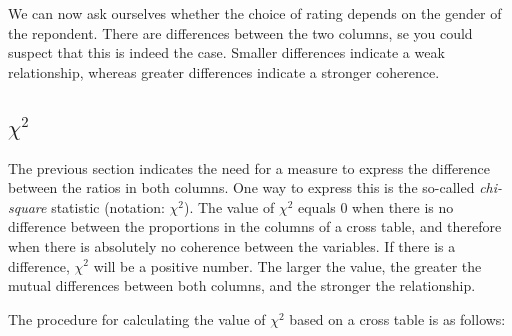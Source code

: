 We can now ask ourselves whether the choice of rating depends on the gender of the repondent. There are differences between the two columns, se you could suspect that this is indeed the case. Smaller differences indicate a weak relationship, whereas greater differences indicate a stronger coherence.

\subsection{\texorpdfstring{$\chi^{2}$}{chi-square}}
\label{ssec:chi-square}

The previous section indicates the need for a measure to express the difference between the ratios in both columns. One way to express this is the so-called \emph{chi-square} statistic (notation: $\chi^{2}$). The value of $\chi^2$ equals 0 when there is no difference between the proportions in the columns of a cross table, and therefore when there is absolutely no coherence between the variables. If there is a difference, $\chi^2$ will be a positive number. The larger the value, the greater the mutual differences between both columns, and the stronger the relationship.

The procedure for calculating the value of $\chi^2$ based on a cross table is as follows:

